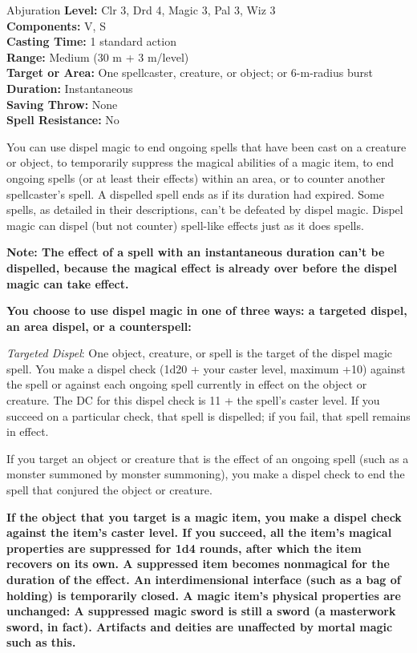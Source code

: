 {Abjuration}
{
	\textbf{Level:}
	Clr 3, Drd 4, Magic 3, Pal 3, Wiz 3\\
	\textbf{Components:}
	V, S\\
	\textbf{Casting Time:}
	1 standard action\\
	\textbf{Range:}
	Medium (30 m + 3 m/level)\\
	\textbf{Target or Area:}
	One spellcaster, creature, or object; or 6-m-radius burst\\
	\textbf{Duration:}
	Instantaneous\\
	\textbf{Saving Throw:}
	None\\
	\textbf{Spell Resistance:}
	No\\
}
{
	You can use dispel magic to end ongoing spells that have been cast on a creature or object, to temporarily suppress the magical abilities of a magic item, to end ongoing spells (or at least their effects) within an area, or to counter another spellcaster's spell. A dispelled spell ends as if its duration had expired. Some spells, as detailed in their descriptions, can't be defeated by dispel magic. Dispel magic can dispel (but not counter) spell-like effects just as it does spells.

	\textbf{Note: The effect of a spell with an instantaneous duration can't be dispelled, because the magical effect is already over before the dispel magic can take effect.}

	\textbf{	You choose to use dispel magic in one of three ways: a targeted dispel, an area dispel, or a counterspell:}

	\textit{Targeted Dispel}:
	One object, creature, or spell is the target of the dispel magic spell. You make a dispel check (1d20 + your caster level, maximum +10) against the spell or against each ongoing spell currently in effect on the object or creature. The DC for this dispel check is 11 + the spell's caster level. If you succeed on a particular check, that spell is dispelled; if you fail, that spell remains in effect.

	If you target an object or creature that is the effect of an ongoing spell (such as a monster summoned by monster summoning), you make a dispel check to end the spell that conjured the object or creature.

	\textbf{	If the object that you target is a magic item, you make a dispel check against the item's caster level. If you succeed, all the item's magical properties are suppressed for 1d4 rounds, after which the item recovers on its own. A suppressed item becomes nonmagical for the duration of the effect. An interdimensional interface (such as a bag of holding) is temporarily closed. A magic item's physical properties are unchanged: A suppressed magic sword is still a sword (a masterwork sword, in fact). Artifacts and deities are unaffected by mortal magic such as this.}

}
